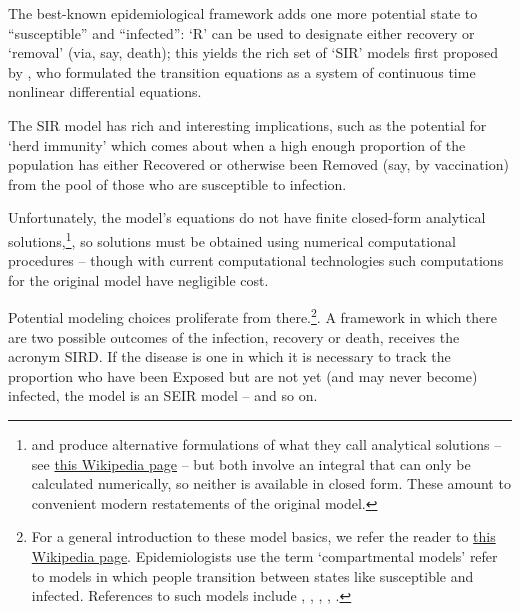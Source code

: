 The best-known epidemiological framework adds one more potential state to ``susceptible'' and ``infected'':  `R' can be used to designate either recovery or `removal' (via, say, death); this yields the rich set of `SIR' models first proposed by \cite{kermack_contribution_1927}, who formulated the transition equations as a system of continuous time nonlinear differential equations.

The SIR model has rich and interesting implications, such as the potential for `herd immunity' which comes about when a high enough proportion of the population has either Recovered or otherwise been Removed (say, by vaccination) from the pool of those who are susceptible to infection.

Unfortunately, the model's equations do not have finite closed-form analytical solutions,\footnote{\cite{miller20212note} and \cite{harko2014exact}  produce alternative formulations of what they call analytical solutions -- see   \href{https://en.wikipedia.org/wiki/Compartmental_models_in_epidemiology\#Transition_rates}{this Wikipedia page} -- but both involve an integral that can only be calculated numerically, so neither is available in closed form.  These amount to convenient modern restatements of the original \cite{kermack_contribution_1927} model.}, so solutions must be obtained using numerical computational procedures -- though with current computational technologies such computations for the original \cite{kermack_contribution_1927} model have negligible cost.

Potential modeling choices proliferate from there.\footnote{For a general introduction to these model basics, we refer the reader to \href{https://en.wikipedia.org/wiki/Compartmental_models_in_epidemiology\#Transition_rates}{this Wikipedia page}. Epidemiologists use the term `compartmental models' refer to models in which people transition between states like susceptible and infected.  References to such models include	 \href{https://royalsocietypublishing.org/doi/10.1098/rspa.1927.0118}{\cite{kermack_contribution_1927}},  \href{https://www.ncbi.nlm.nih.gov/pmc/articles/PMC3710332/}{\cite{bailey1975mathematical}}, \href{https://www.amazon.com/Infectious-Diseases-Humans-Dynamics-Control/dp/019854040X}{\cite{anderson_infectious_1992}}, \href{https://epubs.siam.org/doi/abs/10.1137/S0036144500371907}{\cite{hethcote_mathematics_2000}}, \href{https://www.ncbi.nlm.nih.gov/pmc/articles/PMC6001967/}{\cite{brauer2017mathematical}}.}.  A framework in which there are two possible outcomes of the infection, recovery or death, receives the acronym SIRD.  If the disease is one in which it is necessary to track the proportion who have been Exposed but are not yet (and may never become) infected, the model is an SEIR model -- and so on.

